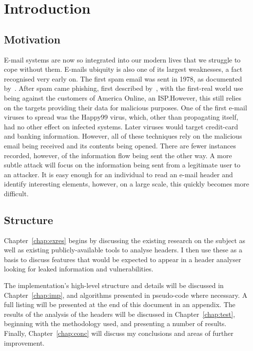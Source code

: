 \documentclass[a4paper,DIV=13,BCOR=7mm,abstract=yes,twoside,10pt]{scrreprt}
\begin{document}
    \chapter{Introduction}

    \section{Motivation}

    E-mail systems are now so integrated into our modern lives that we struggle to
    cope without them.  E-mails ubiquity is also one of its largest weaknesses, a
    fact recognised very early on.  The first spam email was sent in 1978, as
    documented by~\cite{templeton}.  After spam came phishing, first described
    by~\cite{felix1987system}, with the first-real world use being against the
    customers of America Online, an ISP.\@  However, this still relies on the
    targets providing their data for malicious purposes. One of the first e-mail
    viruses to spread was the Happy99 virus, which, other than propagating itself,
    had no other effect on infected systems. Later viruses would target credit-card
    and banking information. However, all of these techniques rely on the malicious
    email being received and its contents being opened.  There are fewer instances
    recorded, however, of the information flow being sent the other way.  A more
    subtle attack will focus on the information being sent from a legitimate user to
    an attacker. It is easy enough for an individual to read an e-mail header and
    identify interesting elements, however, on a large scale, this quickly becomes
    more difficult.

    \section{Structure}

    Chapter~\ref{chap:exres} begins by discussing the existing research on
    the subject as well as existing publicly-available tools to analyse
    headers.  I then use these as a basis to discuss features that would be
    expected to appear in a header analyser looking for leaked information
    and vulnerabilities.

    The implementation's high-level structure and details will be discussed in
    Chapter~\ref{chap:imp}, and algorithms presented in pseudo-code where
    necessary.  A full listing will be presented at the end of this document in
    an appendix. The results of the analysis of the headers will be discussed in
    Chapter~\ref{chap:test}, beginning with the methodology used, and presenting
    a number of results. Finally, Chapter~\ref{chap:conc} will discuss my
    conclusions and areas of further improvement.

    \cleardoublepage  
    \cleardoublepage 
    \cleardoublepage  
    \cleardoublepage 

    \printbibliography{} 
\end{document}
